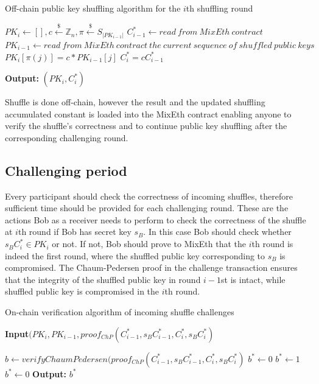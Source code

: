 \documentclass[a4paper]{article}
\theoremstyle{definition}
\begin{document}
\begin{algorithm}[H]
	\caption{Off-chain public key shuffling algorithm for the $i$th shuffling round}\label{shufflingoffchain}
	\begin{algorithmic}[H]
		\State $PK_{i} \gets []
		,c\stackrel{\$}{\leftarrow}\mathbb{Z}_n,\pi\stackrel{\$}{\leftarrow}S_{|PK_{i-1}|}$
		\State $C^{*}_{i-1}\leftarrow read\ from\ MixEth\ contract$
		\State $PK_{i-1}\leftarrow read\ from\ MixEth\ contract\ the\ current\ sequence\ of\ shuffled\ public\ keys$
		\State $PK_{i}[\pi(j)]=c*PK_{i-1}[j]$ 
		\EndFor
		\State $C^{*}_{i}=cC^{*}_{i-1}$
		
		\hspace*{\algorithmicindent} \textbf{Output:} $(PK_{i},C^{*}_{i})$ 
	\end{algorithmic}   
\end{algorithm}

Shuffle is done off-chain, however the result and the updated shuffling accumulated constant is loaded into the MixEth contract enabling anyone to verify the shuffle's correctness and to continue public key shuffling after the corresponding challenging round.

\subsection{Challenging period}
Every participant should check the correctness of incoming shuffles, therefore sufficient time should be provided for each challenging round. These are the actions Bob as a receiver needs to perform to check the correctness of the shuffle at $i$th round if Bob has secret key $s_{B}$. In this case Bob should check whether $s_{B}C^{*}_{i} \in PK_{i}$ or not. If not, Bob should prove to MixEth that the $i$th round is indeed the first round, where the shuffled public key corresponding to $s_{B}$ is compromised. The Chaum-Pedersen proof in the challenge transaction ensures that the integrity of the shuffled public key in round $i-1$st is intact, while shuffled public key is compromised in the $i$th round.   

\begin{algorithm}
	\caption{On-chain verification algorithm of incoming shuffle challenges}\label{verifyingshufflingoffchain}
	\hspace*{\algorithmicindent} \textbf{Input}$(PK_{i}, PK_{i-1}, proof_{ChP}(C^{*}_{i-1},s_{B}C^{*}_{i-1},C^{*}_{i},s_{B}C^{*}_{i})$ \\
	\begin{algorithmic}[1]
		\State $b\leftarrow verifyChaumPedersen(proof_{ChP}(C^{*}_{i-1},s_{B}C^{*}_{i-1}, C^{*}_{i},s_{B}C^{*}_{i})$ 
		\State $b^*\leftarrow0$
		\State $b^*\gets 1$
		\Else
		\State $b^*\gets 0$
		\EndIf
		\hspace*{\algorithmicindent} \textbf{Output:} $b^{*}$ 
	\end{algorithmic}   
\end{algorithm} 
\end{document}
